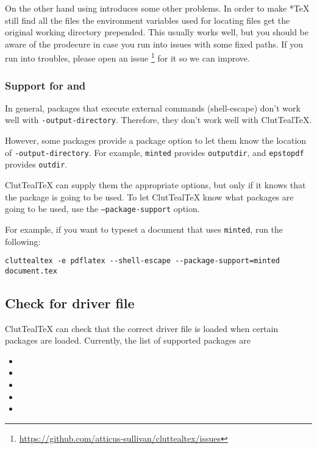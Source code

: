 \documentclass[a4paper, 11pt]{scrartcl}
\let\TeXold\TeX
\newcommand\CluttealTeX{ClutTeal\TeX\xspace}
\renewcommand\TeX{\TeXold\xspace}
\newcommand\texpkg[1]{\texttt{#1}}
\begin{document}
On the other hand using  introduces some other problems.
In order to make *\TeX still find all the files the environment variables used for locating files get the original working directory prepended.
This usually works well, but you should be aware of the prodecure in case you run into issues with some fixed paths.
If you run into troubles, please open an issue \footnote{\url{https://github.com/atticus-sullivan/cluttealtex/issues}} for it so we can improve.

\subsubsection{Support for  and } \label{sec:supp-pkg}
In general, packages that execute external commands (shell-escape) don't work well with \texttt{-output-directory}.
Therefore, they don't work well with \CluttealTeX.

However, some packages provide a package option to let them know the location of \texttt{-output-directory}.
For example, \texpkg{minted} provides \texttt{outputdir}, and \texpkg{epstopdf} provides \texttt{outdir}.

\CluttealTeX can supply them the appropriate options, but only if it knows that the package is going to be used.
To let \CluttealTeX know what packages are going to be used, use the \texttt{--package-support} option.

For example, if you want to typeset a document that uses \texpkg{minted}, run the following:
\begin{verbatim}
cluttealtex -e pdflatex --shell-escape --package-support=minted document.tex
\end{verbatim}

\subsection{Check for driver file}

\CluttealTeX can check that the correct driver file is loaded when certain packages are loaded.
Currently, the list of supported packages are
\begin{multicols}{3}
	\begin{itemize}
		\item {}
		\item {}
		\item {}
		\item {}
		\item {}
	\end{itemize}
\end{multicols}
\end{document}

